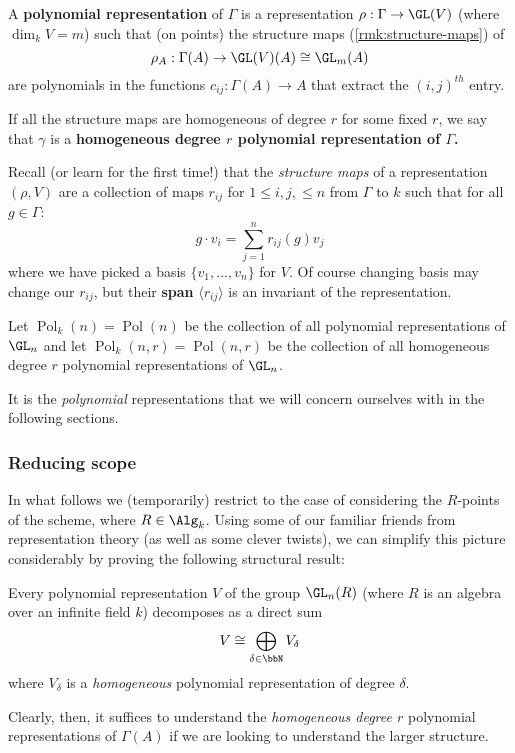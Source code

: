 \documentclass[12pt]{article}
\DeclareMathOperator{\Pol}{Pol}
\begin{document}
\begin{defn}\label{def:poly-rep}
	A \textbf{polynomial representation} of $\Gamma$ is a representation $\rho:\Gamma\to \GL(V)$ (where $\dim_k V=m$) such that (on points) the structure maps (\ref{rmk:structure-maps}) of 
	\[\rho_A:\Gamma(A)\to \GL(V)(A)\cong\GL_m(A)\] 
	are polynomials in the functions $c_{ij}:\Gamma(A)\to A$ that extract the $(i,j)^{th}$ entry.

	If all the structure maps are homogeneous of degree $r$ for some fixed $r$, we say that $\gamma$ is a \textbf{homogeneous degree $r$
	polynomial representation of $\Gamma$.}
\end{defn}
\begin{rmk}\label{rmk:structure-maps}
	Recall (or learn for the first time!) that the \textit{structure maps} of a representation $(\rho,V)$ are a collection 
	of maps $r_{ij}$ for $1\le i,j,\le n$ from $\Gamma$ to $k$ such that for all $g\in \Gamma$:
	\[g\cdot v_i=\sum_{j=1}^n r_{ij}(g)v_j\]
	where we have picked a basis $\{v_1,\dots,v_n\}$ for $V$. Of course changing basis may change our 
	$r_{ij}$, but their \textbf{span} $\langle r_{ij}\rangle$ is an invariant of the representation.
\end{rmk}
\begin{defn}\label{def:Mnr}
	Let $\Pol_k(n)=\Pol(n)$ be the collection of all polynomial representations of $\GL_n$ and let $\Pol_k(n,r)=\Pol(n,r)$ 
	be the collection of all homogeneous degree $r$ polynomial representations of $\GL_n$.
\end{defn}
It is the \textit{polynomial} representations that we will concern ourselves with in the following sections. 

\subsubsection{Reducing scope}
In what follows we (temporarily) restrict to the case of considering the $R$-points of the scheme, where $R\in\Alg_k$. 
Using some of our familiar friends from representation theory (as well as some clever twists), 
we can simplify this picture considerably by proving the following structural result:
\begin{thm}\label{thm:decomp}
	Every polynomial representation $V$ of the group $\GL_n(R)$ (where $R$ is an algebra over an infinite field $k$) decomposes as a direct sum 
	\[V\cong\bigoplus_{\delta\in\bbN}V_\delta\]
	where $V_\delta$ is a \textit{homogeneous} polynomial representation of degree $\delta.$
\end{thm}
Clearly, then, it suffices to understand the \textit{homogeneous degree $r$} polynomial representations of $\Gamma(A)$ if we are looking
to understand the larger structure.
\end{document}
